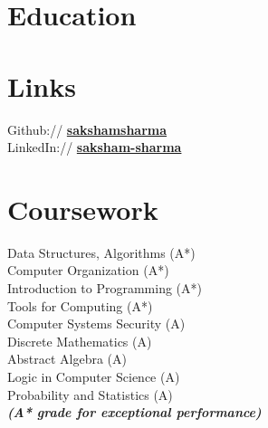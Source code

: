 \documentclass[a4paper]{deedy-resume} %
\begin{document}

\begin{minipage}[t]{0.33\textwidth} %

  \section{Education} 



  \sectionspace
  \sectionspace
  \sectionspace


  \sectionspace

  \section{Links} 

  Github:// \href{https://github.com/sakshamsharma}{\bf sakshamsharma} \\
  LinkedIn:// \href{https://www.linkedin.com/in/sakshamsharma}{\bf saksham-sharma} \\

  \sectionspace

  \section{Coursework}
  Data Structures, Algorithms (A*)\\
  Computer Organization (A*)\\
  Introduction to Programming (A*)\\
  Tools for Computing (A*)\\
  Computer Systems Security (A)\\
  Discrete Mathematics (A)\\
  Abstract Algebra (A)\\
  Logic in Computer Science (A)\\
  Probability and Statistics (A)\\

  {\footnotesize \textit{\textbf{(A* grade for exceptional performance) }}} \\


\end{minipage}
\end{document}
